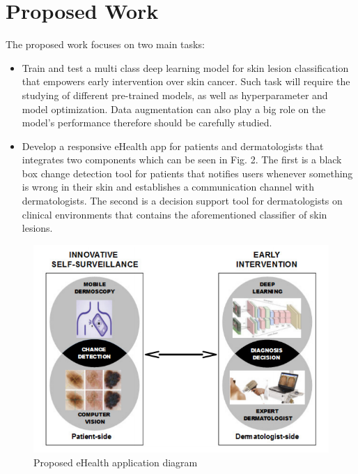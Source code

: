 \documentclass[journal,compsoc]{IEEEtran}
\begin{document}
\section{Proposed Work}
The proposed work focuses on two main tasks:
\begin{itemize}
\item Train and test a multi class deep learning model for skin lesion classification that empowers early intervention over skin cancer. Such task will require the studying of different pre-trained models, as well as hyperparameter and model optimization. Data augmentation can also play a big role on the model's performance therefore should be carefully studied.
\item Develop a responsive eHealth app for patients and dermatologists that integrates two components which can be seen in Fig. 2. The first is a black box change detection tool for patients that notifies users whenever something is wrong in their skin and establishes a communication channel  with dermatologists. The second is a decision support tool for dermatologists on clinical environments that contains the aforementioned classifier of skin lesions. 
\end{itemize}
\begin{figure}[ht]
  \centering
    \includegraphics[scale=1,width=\linewidth]{figures/Dissertation_Plan.png}
  \caption{Proposed eHealth application diagram}
\end{figure}
\end{document}
